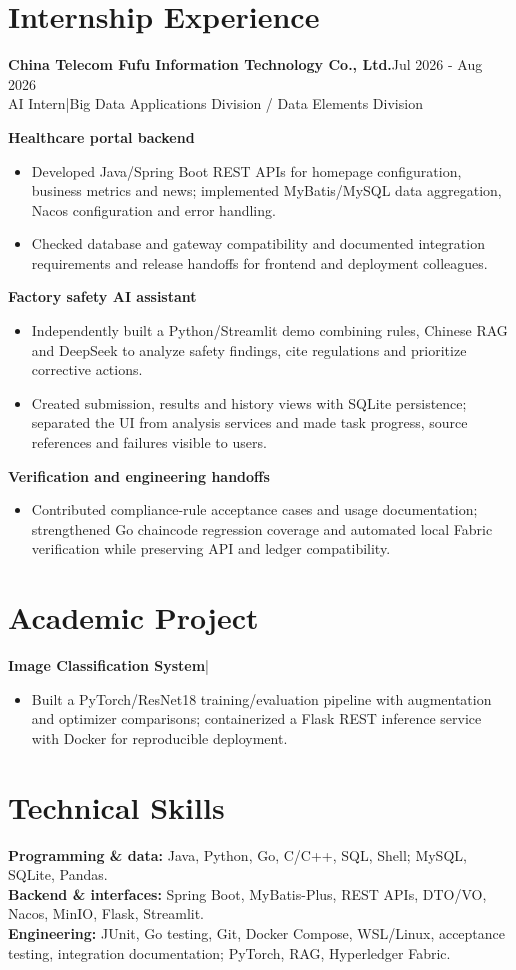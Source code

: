 \documentclass[11pt,a4paper]{article}
\newcommand{\project}[1]{\par\vspace{2pt}\textbf{#1}\par}
\begin{document}
\section*{Internship Experience}
\textbf{China Telecom Fufu Information Technology Co., Ltd.}\hfill Jul 2026 - Aug 2026\\
AI Intern\enspace|\enspace Big Data Applications Division / Data Elements Division
\project{Healthcare portal backend}
\begin{itemize}
\item Developed Java/Spring Boot REST APIs for homepage configuration, business metrics and news; implemented MyBatis/MySQL data aggregation, Nacos configuration and error handling.
\item Checked database and gateway compatibility and documented integration requirements and release handoffs for frontend and deployment colleagues.
\end{itemize}
\project{Factory safety AI assistant}
\begin{itemize}
\item Independently built a Python/Streamlit demo combining rules, Chinese RAG and DeepSeek to analyze safety findings, cite regulations and prioritize corrective actions.
\item Created submission, results and history views with SQLite persistence; separated the UI from analysis services and made task progress, source references and failures visible to users.
\end{itemize}
\project{Verification and engineering handoffs}
\begin{itemize}
\item Contributed compliance-rule acceptance cases and usage documentation; strengthened Go chaincode regression coverage and automated local Fabric verification while preserving API and ledger compatibility.
\end{itemize}

\section*{Academic Project}
\textbf{Image Classification System}\enspace|
\begin{itemize}
\item Built a PyTorch/ResNet18 training/evaluation pipeline with augmentation and optimizer comparisons; containerized a Flask REST inference service with Docker for reproducible deployment.
\end{itemize}

\section*{Technical Skills}
\textbf{Programming \& data:} Java, Python, Go, C/C++, SQL, Shell; MySQL, SQLite, Pandas.\\
\textbf{Backend \& interfaces:} Spring Boot, MyBatis-Plus, REST APIs, DTO/VO, Nacos, MinIO, Flask, Streamlit.\\
\textbf{Engineering:} JUnit, Go testing, Git, Docker Compose, WSL/Linux, acceptance testing, integration documentation; PyTorch, RAG, Hyperledger Fabric.
\end{document}
